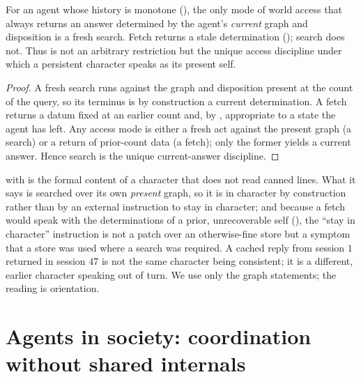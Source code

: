 \documentclass[11pt,twocolumn,a4paper]{article}
\begin{document}
\begin{corollary}
\label{cor:search-forced}
For an agent whose history is monotone (), the only mode
of world access that always returns an answer determined by the agent's
\emph{current} graph and disposition is a fresh search. Fetch returns a
stale determination (); search does not. Thus
 is not an arbitrary restriction but the unique access
discipline under which a persistent character speaks as its present self.
\end{corollary}

\begin{proof}
A fresh search runs against the graph and disposition present at the count
of the query, so its terminus is by construction a current determination.
A fetch returns a datum fixed at an earlier count and, by
, appropriate to a state the agent has left.
Any access mode is either a fresh act against the present graph (a search)
or a return of prior-count data (a fetch); only the former yields a current
answer. Hence search is the unique current-answer discipline.
\end{proof}

\begin{remark}
\label{rem:incharacter}
 with  is the formal
content of a character that does not read canned lines. What it says is
searched over its own \emph{present} graph, so it is in character by
construction rather than by an external instruction to stay in character;
and because a fetch would speak with the determinations of a prior,
unrecoverable self (), the ``stay in
character'' instruction is not a patch over an otherwise-fine store but a
symptom that a store was used where a search was required. A cached reply
from session $1$ returned in session $47$ is not the same character being
consistent; it is a different, earlier character speaking out of turn. We
use only the graph statements; the reading is orientation.
\end{remark}

\section{Agents in society: coordination without shared internals}
\label{sec:society}
\end{document}
